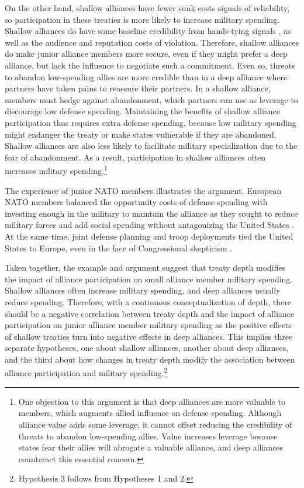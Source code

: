 \documentclass[12pt]{article}
\begin{document}
On the other hand, shallow alliances have fewer sunk costs signals of reliability, so participation in these treaties is more likely to increase military spending. 
Shallow alliances do have some baseline credibility from hands-tying signals \citep{Fearon1997}, as well as the audience \citep{Morrow2000} and reputation \citep{Gibler2008, Crescenzietal2012} costs of violation.
Therefore, shallow alliances do make junior alliance members more secure, even if they might prefer a deep alliance, but lack the influence to negotiate such a commitment. 
Even so, threats to abandon low-spending allies are more credible than in a deep alliance where partners have taken pains to reassure their partners.  
In a shallow alliance, members must hedge against abandonment, which partners can use as leverage to discourage low defense spending. 
Maintaining the benefits of shallow alliance participation thus requires extra defense spending, because low military spending might endanger the treaty or make states vulnerable if they are abandoned. 
Shallow alliances are also less likely to facilitate military specialization due to the fear of abandonment. 
As a result, participation in shallow alliances often increases military spending.\footnote{
One objection to this argument is that deep alliances are more valuable to members, which augments allied influence on defense spending. 
Although alliance value adds some leverage, it cannot offset reducing the credibility of threats to abandon low-spending allies.
Value increases leverage because states fear their allies will abrogate a valuable alliance, and deep alliances counteract this essential concern. 
}


The experience of junior NATO members illustrates the argument. 
European NATO members balanced the opportunity costs of defense spending with investing enough in the military to maintain the alliance as they sought to reduce military forces and add social spending without antagonizing the United States \citep[pg. 182-3]{Sayle2019}.
At the same time, joint defense planning and troop deployments tied the United States to Europe, even in the face of Congressional skepticism \citep[pg 175]{Sayle2019}. 
 
 
Taken together, the example and argument suggest that treaty depth modifies the impact of alliance participation on small alliance member military spending. 
Shallow alliances often increase military spending, and deep alliances usually reduce spending.  
Therefore, with a continuous conceptualization of depth, there should be a negative correlation between treaty depth and the impact of alliance participation on junior alliance member military spending as the positive effects of shallow treaties turn into negative effects in deep alliances. 
This implies three separate hypotheses, one about shallow alliances, another about deep alliances, and the third about how changes in treaty depth modify the association between alliance participation and military spending.\footnote{Hypothesis 3 follows from Hypotheses 1 and 2.}
 
\end{document}

